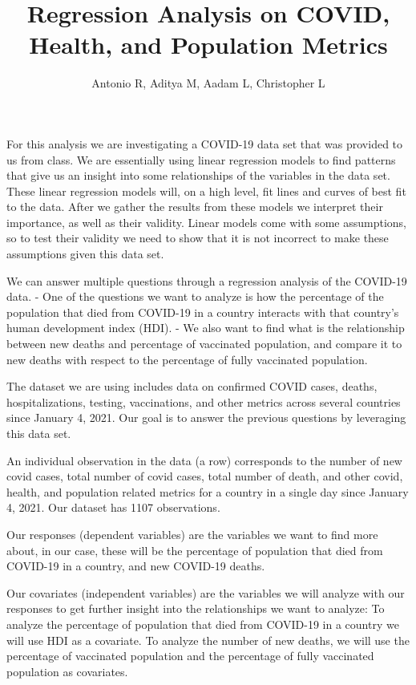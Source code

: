 \documentclass[
  12pt,
]{article}
\title{Regression Analysis on COVID, Health, and Population Metrics}
\author{Antonio R, Aditya M, Aadam L, Christopher L}
\date{}
\begin{document}
\maketitle

For this analysis we are investigating a COVID-19 data set that was
provided to us from class. We are essentially using linear regression
models to find patterns that give us an insight into some relationships
of the variables in the data set. These linear regression models will,
on a high level, fit lines and curves of best fit to the data. After we
gather the results from these models we interpret their importance, as
well as their validity. Linear models come with some assumptions, so to
test their validity we need to show that it is not incorrect to make
these assumptions given this data set.

We can answer multiple questions through a regression analysis of the
COVID-19 data. - One of the questions we want to analyze is how the
percentage of the population that died from COVID-19 in a country
interacts with that country's human development index (HDI). - We also
want to find what is the relationship between new deaths and percentage
of vaccinated population, and compare it to new deaths with respect to
the percentage of fully vaccinated population.

The dataset we are using includes data on confirmed COVID cases, deaths,
hospitalizations, testing, vaccinations, and other metrics across
several countries since January 4, 2021. Our goal is to answer the
previous questions by leveraging this data set.

An individual observation in the data (a row) corresponds to the number
of new covid cases, total number of covid cases, total number of death,
and other covid, health, and population related metrics for a country in
a single day since January 4, 2021. Our dataset has 1107 observations.

Our responses (dependent variables) are the variables we want to find
more about, in our case, these will be the percentage of population that
died from COVID-19 in a country, and new COVID-19 deaths.

Our covariates (independent variables) are the variables we will analyze
with our responses to get further insight into the relationships we want
to analyze: To analyze the percentage of population that died from
COVID-19 in a country we will use HDI as a covariate. To analyze the
number of new deaths, we will use the percentage of vaccinated
population and the percentage of fully vaccinated population as
covariates.
\end{document}
